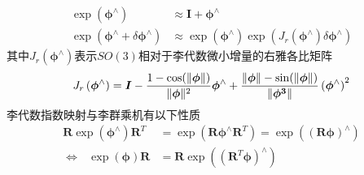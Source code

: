 \begin{equation}
\label{equ3}
\begin{aligned}
\exp\left( \boldsymbol{\phi}^{\wedge} \right) & \approx  \boldsymbol{I} + \boldsymbol{\phi}^{\wedge}
\\
\exp\left( \boldsymbol{\phi}^{\wedge} + \delta\boldsymbol{\phi}^{\wedge}  \right) & \approx \exp \left( \boldsymbol{\phi}^{\wedge} \right)  \exp \left( J_r\left( \boldsymbol{\phi}^{\wedge} \right) \delta\boldsymbol{\phi}^{\wedge} \right)
\end{aligned}
\end{equation}
其中$J_r\left( \boldsymbol{\phi}^{\wedge} \right)$表示$SO(3)$相对于李代数微小增量的右雅各比矩阵
\begin{equation}
\label{equ4}
J_r\left( \boldsymbol{\phi}^{\wedge} \right) = \boldsymbol{I} - {{1-\cos(\Vert \boldsymbol{\phi} \Vert)} \over \Vert \boldsymbol{\phi} \Vert^2 } \boldsymbol{\phi}^{\wedge}+
{{ \Vert \boldsymbol{\phi} \Vert-\sin(\Vert \boldsymbol{\phi} \Vert)} \over \Vert \boldsymbol{\phi^3} \Vert }\left(\boldsymbol{\phi}^{\wedge}\right)^2
\end{equation}
李代数指数映射与李群乘机有以下性质
\begin{equation}
\label{equ5}
\begin{aligned}
\boldsymbol{R} \exp \left( \boldsymbol{\phi}^{\wedge} \right) \boldsymbol{R}^T &= \exp \left( \boldsymbol{R}  \boldsymbol{\phi}^{\wedge} \boldsymbol{R}^T \right) = \exp \left( \left( \boldsymbol{R} \boldsymbol{\phi} \right)^\wedge\right)
\\ 
\Leftrightarrow \ \ \ \exp \left( \boldsymbol{\phi} \right) \boldsymbol{R} &=  \boldsymbol{R} \exp \left(\left( \boldsymbol{R}^T  \boldsymbol{\phi} \right)^\wedge\right)
\end{aligned}
\end{equation}

